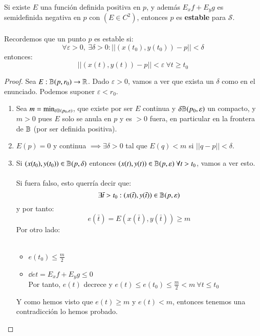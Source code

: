 \begin{pro}[Estabilidad]\label{pro:establ}
    Si existe $E$ una función definida positiva en $p$, y además $E_x f + E_y g$ es semidefinida negativa en $p$ con $(E \in C^2)$, entonces $p$ es \textbf{estable} para $\mathcal{S}$.\\\\

    Recordemos que un punto $p$ es estable si:
    $$
        \forall \varepsilon > 0,\ \exists \delta > 0 : ||(x(t_0),y(t_0)) - p|| < \delta
    $$
    entonces:
    $$
        ||(x(t), y(t)) - p||< \varepsilon\ \forall t \geq t_0
    $$
\end{pro}
\begin{proof}
    Sea $ E: \mathbb{B}(p, r_0) \to \mathbb{R}$. Dado $\varepsilon > 0$, vamos a ver que exista un $\delta$ como en el enunciado. Podemos suponer $\varepsilon < r_0$.
    \begin{enumerate}
        \item Sea $m = \min_{\delta \mathbb{B}(p_0, \varepsilon)}$, que existe por ser $E$ continua y $\delta \mathbb{B}(p_0, \varepsilon)$ un compacto, y $m>0$ pues $E$ solo se anula en $p$ y es $>0$ fuera, en particular en la frontera de $\mathbb{B}$ (por ser definida positiva).
        \item $E(p) = 0$ y continua $\implies \exists \delta > 0$ tal que $E(q) < m$ si $||q - p|| < \delta$.
        \item Si $(x(t_0), y(t_0)) \in \mathbb{B}(p, \delta)$ entonces $(x(t), y(t)) \in \mathbb{B}(p, \varepsilon)\ \forall t > t_0$, vamos a ver esto.\\\\
        Si fuera falso, esto querría decir que:
        $$
            \exists \bar{t} > t_0 : (x(\bar{t}), y(\bar{t})) \in \mathbb{B}(p, \varepsilon)
        $$
        y por tanto:
        $$
            e(\bar{t}) = E(x(\bar{t}), y(\bar{t})) \geq m
        $$
        Por otro lado:\\\\
        \begin{itemize}
            \item $e(t_0) \leq \frac{m}{2}$
            \item $\dd{e}{t} = E_x f + E_y g \leq 0$\\
            Por tanto, $e(t)$ decrece y $e(t) \leq e(t_0) \leq \frac{m}{2} < m\ \forall t \leq t_0$
        \end{itemize}
        Y como hemos visto que $e(t) \geq m$ y $e(t) < m$, entonces tenemos una contradicción lo hemos probado.
    \end{enumerate}
\end{proof}
